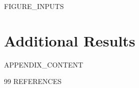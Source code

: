 \clearpage
{{FIGURE_INPUTS}}


\appendix
\section{Additional Results}
\label{sec:appendix}
{{APPENDIX_CONTENT}}


\clearpage
\begin{thebibliography}{99}
{{REFERENCES}}
\end{thebibliography}


